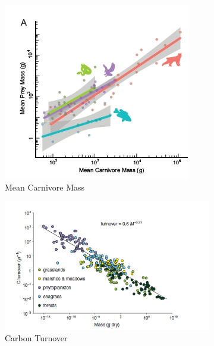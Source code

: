 \documentclass[]{article}
\begin{document}
\begin{figure}[H]
	\caption{Scaling in individuals and	ecosystems}\label{fig:Scaling:individuals:ecosystems}
	\begin{subfigure}[b]{0.45\textwidth}
		\caption{Mean Carnivore Mass}\label{fig:mcm}
		\includegraphics[width=\textwidth]{Scaling1}
	\end{subfigure}
	\begin{subfigure}[b]{0.45\textwidth}
		\caption{Carbon Turnover}\label{fig:ct}
		\includegraphics[width=\textwidth]{Scaling2}
	\end{subfigure}
	\begin{subfigure}[b]{0.45\textwidth}

\end{subfigure}
\end{figure}
\end{document}

